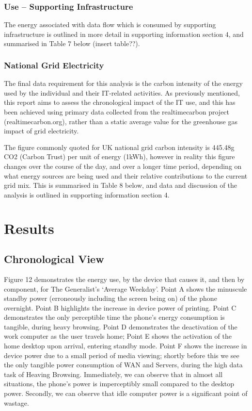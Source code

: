 \documentclass[conference]{IEEEtran}
\begin{document}
\subsubsection{Use -- Supporting Infrastructure}

The energy associated with data flow which is consumed by supporting
infrastructure is outlined in more detail in supporting information
section 4, and summarised in Table 7 below (insert table??).

\subsubsection{National Grid Electricity}

The final data requirement for this analysis is the carbon intensity
of the energy used by the individual and their IT-related
activities. As previously mentioned, this report aims to assess the
chronological impact of the IT use, and this has been achieved using
primary data collected from the realtimecarbon project
(realtimecarbon.org), rather than a static average value for the
greenhouse gas impact of grid electricity.

The figure commonly quoted for UK national grid carbon intensity is
445.48g CO2 (Carbon Trust) per unit of energy (1kWh), however in
reality this figure changes over the course of the day, and over a
longer time period, depending on what energy sources are being used
and their relative contributions to the current grid mix. This is
summarised in Table 8 below, and data and discussion of the analysis
is outlined in supporting information section 4.


\section{Results}

\subsection{Chronological View}

Figure 12 demonstrates the energy use, by the device that causes it,
and then by component, for The Generalist’s ‘Average Weekday’. Point A
shows the minuscule standby power (erroneously including the screen
being on) of the phone overnight. Point B highlights the increase in
device power of printing. Point C demonstrates the only perceptible
time the phone’s energy consumption is tangible, during heavy
browsing. Point D demonstrates the deactivation of the work computer
as the user travels home; Point E shows the activation of the home
desktop upon arrival, entering standby mode. Point F shows the
increase in device power due to a small period of media viewing;
shortly before this we see the only tangible power consumption of WAN
and Servers, during the high data task of Heaving Browsing.
Immediately, we can observe that in almost all situations, the phone’s
power is imperceptibly small compared to the desktop power. Secondly,
we can observe that idle computer power is a significant point of
wastage.
\end{document}
